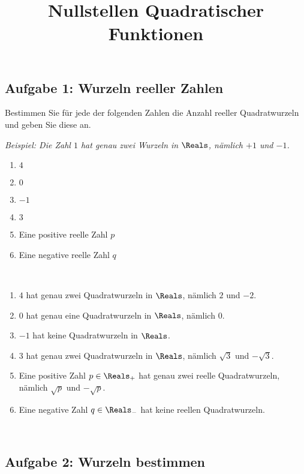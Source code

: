 \documentclass[12pt]{article}
\title{Nullstellen Quadratischer Funktionen}
\begin{document}
\maketitle

\subsection*{Aufgabe 1: Wurzeln reeller Zahlen}
Bestimmen Sie für jede der folgenden Zahlen die Anzahl reeller Quadratwurzeln und geben Sie diese an.

\emph{Beispiel: Die Zahl $1$ hat genau zwei Wurzeln in $\Reals$, nämlich $+1$ und $-1$.}

\begin{enumerate}[2col, label=\alph*)]
\item $4$
\item $0$
\item $-1$
\item $3$
\item Eine positive reelle Zahl $p$
\item Eine negative reelle Zahl $q$
\end{enumerate}\hfill\\
\begin{solution}
\begin{enumerate}[2col, label=\alph*)]
\item $4$ hat genau zwei Quadratwurzeln in $\Reals$, nämlich $2$ und $-2$.
\item $0$ hat genau eine Quadratwurzeln in $\Reals$, nämlich $0$.
\item $-1$ hat keine Quadratwurzeln in $\Reals$.
\item $3$ hat genau zwei Quadratwurzeln in $\Reals$, nämlich $\sqrt{3}$ und $-\sqrt{3}.$
\item Eine positive Zahl $p \in \Reals_{+}$ hat genau zwei reelle Quadratwurzeln, nämlich $\sqrt{p}$ und $-\sqrt{p}.$
\item Eine negative Zahl $q \in \Reals_{-}$ hat keine reellen Quadratwurzeln.
\end{enumerate}\hfill\\
\end{solution}

\subsection*{Aufgabe 2: Wurzeln bestimmen}
\end{document}
